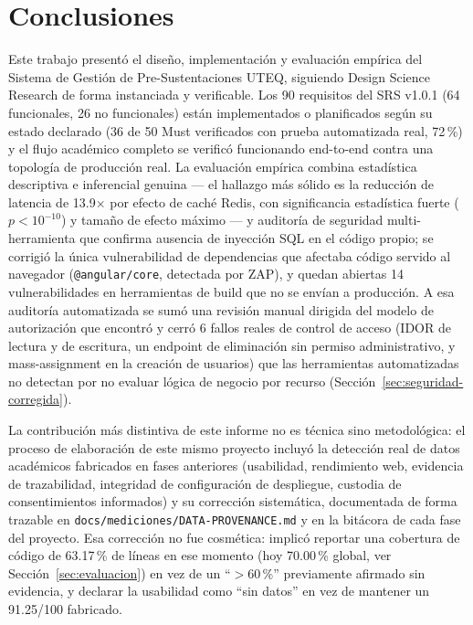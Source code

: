 \section{Conclusiones}
\label{sec:conclusiones}

Este trabajo presentó el diseño, implementación y evaluación empírica del Sistema de Gestión de
Pre-Sustentaciones UTEQ, siguiendo Design Science Research \cite{peffers2007} de forma instanciada y
verificable. Los 90 requisitos del SRS v1.0.1 (64 funcionales, 26 no funcionales) están implementados o planificados
según su estado declarado (36 de 50 Must verificados con prueba automatizada real, 72\,\%) y el flujo
académico completo se verificó funcionando end-to-end contra una topología de producción real. La evaluación empírica combina
estadística descriptiva e inferencial genuina --- el hallazgo más sólido es la reducción de latencia de
13.9$\times$ por efecto de caché Redis, con significancia estadística fuerte ($p < 10^{-10}$) y tamaño
de efecto máximo --- y auditoría de seguridad multi-herramienta que confirma ausencia de inyección SQL en
el código propio; se corrigió la única vulnerabilidad de dependencias que afectaba código servido al
navegador (\texttt{@angular/core}, detectada por ZAP), y quedan abiertas 14 vulnerabilidades en
herramientas de build que no se envían a producción. A esa auditoría automatizada se sumó una revisión
manual dirigida del modelo de autorización que encontró y cerró 6 fallos reales de control de acceso
(IDOR de lectura y de escritura, un endpoint de eliminación sin permiso administrativo, y
mass-assignment en la creación de usuarios) que las herramientas automatizadas no detectan por no
evaluar lógica de negocio por recurso (Sección~\ref{sec:seguridad-corregida}).

La contribución más distintiva de este informe no es técnica sino metodológica: el proceso de
elaboración de este mismo proyecto incluyó la detección real de datos académicos fabricados en fases
anteriores (usabilidad, rendimiento web, evidencia de trazabilidad, integridad de configuración de
despliegue, custodia de consentimientos informados) y su corrección sistemática, documentada de forma
trazable en \texttt{docs/mediciones/DATA-PROVENANCE.md} y en la bitácora de cada fase del proyecto. Esa
corrección no fue cosmética: implicó reportar una cobertura de código de 63.17\,\% de líneas en ese
momento (hoy 70.00\,\% global, ver Sección~\ref{sec:evaluacion}) en vez de un ``$>$60\,\%'' previamente afirmado
sin evidencia, y declarar la usabilidad como ``sin datos'' en vez de mantener un 91.25/100 fabricado.

